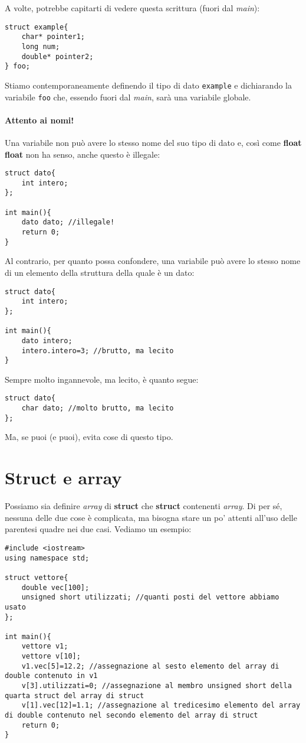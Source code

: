 A volte, potrebbe capitarti di vedere questa scrittura (fuori dal \emph{main}):
\begin{lstlisting}
struct example{
	char* pointer1;
	long num;
	double* pointer2;
} foo;
\end{lstlisting}

Stiamo contemporaneamente definendo il tipo di dato \verb|example| e dichiarando la variabile \verb|foo| che, essendo fuori dal \emph{main}, sarà una variabile globale.

\paragraph{Attento ai nomi!}

Una variabile non può avere lo stesso nome del suo tipo di dato e, così come \textbf{float float} non ha senso, anche questo è illegale:

\begin{lstlisting}
struct dato{
	int intero;
};

int main(){
	dato dato; //illegale!
	return 0;	
}
\end{lstlisting}

Al contrario, per quanto possa confondere, una variabile può avere lo stesso nome di un elemento della struttura della quale è un dato:

\begin{lstlisting}
struct dato{
	int intero;
};

int main(){
	dato intero; 
	intero.intero=3; //brutto, ma lecito
}
\end{lstlisting}

Sempre molto ingannevole, ma lecito, è quanto segue:
\begin{lstlisting}
struct dato{
	char dato; //molto brutto, ma lecito
};
\end{lstlisting}

Ma, se puoi (e puoi), evita cose di questo tipo.
\section{Struct e array}
Possiamo sia definire \emph{array} di \textbf{struct} che \textbf{struct} contenenti \emph{array}. Di per sé, nessuna delle due cose è complicata, ma bisogna stare un po' attenti all'uso delle parentesi quadre nei due casi. Vediamo un esempio:
\begin{lstlisting}
#include <iostream>
using namespace std;

struct vettore{
	double vec[100];
	unsigned short utilizzati; //quanti posti del vettore abbiamo usato
};

int main(){
	vettore v1;
	vettore v[10];
	v1.vec[5]=12.2; //assegnazione al sesto elemento del array di double contenuto in v1
	v[3].utilizzati=0; //assegnazione al membro unsigned short della quarta struct del array di struct 
	v[1].vec[12]=1.1; //assegnazione al tredicesimo elemento del array di double contenuto nel secondo elemento del array di struct
	return 0;
}
\end{lstlisting}

